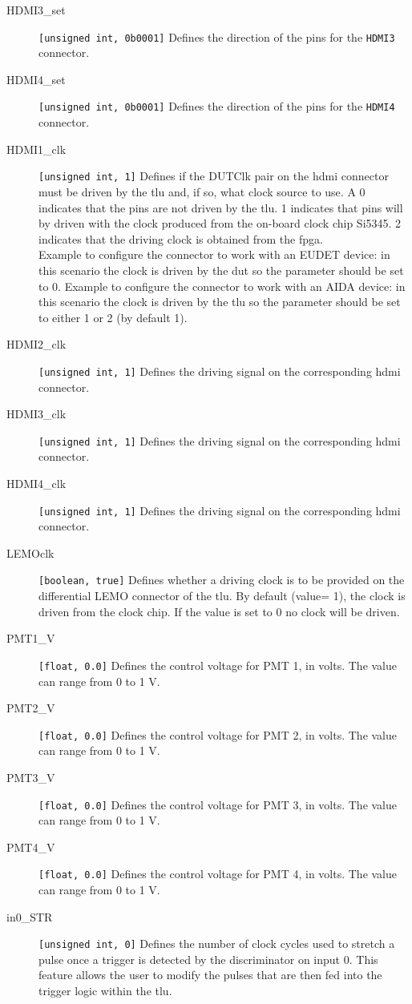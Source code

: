 \begin{description}
  \item[HDMI3\_set] \verb|[unsigned int, 0b0001]| Defines the direction of the pins for the \verb|HDMI3| connector.
  \item[HDMI4\_set] \verb|[unsigned int, 0b0001]| Defines the direction of the pins for the \verb|HDMI4| connector.
  \item[HDMI1\_clk] \verb|[unsigned int, 1]| Defines if the DUTClk pair on the \gls{hdmi} connector must be driven by the \gls{tlu} and, if so, what clock source to use. A 0 indicates that the pins are not driven by the \gls{tlu}. 1 indicates that pins will by driven with the clock produced from the on-board clock chip Si5345. 2 indicates that the driving clock is obtained from the \gls{fpga}.\\
      Example to configure the connector to work with an EUDET device: in this scenario the clock is driven by the \gls{dut} so the parameter should be set to 0.
      Example to configure the connector to work with an AIDA device: in this scenario the clock is driven by the \gls{tlu} so the parameter should be set to either 1 or 2 (by default 1).
  \item[HDMI2\_clk] \verb|[unsigned int, 1]| Defines the driving signal on the corresponding \gls{hdmi} connector.
  \item[HDMI3\_clk] \verb|[unsigned int, 1]| Defines the driving signal on the corresponding \gls{hdmi} connector.
  \item[HDMI4\_clk] \verb|[unsigned int, 1]| Defines the driving signal on the corresponding \gls{hdmi} connector.
  \item[LEMOclk] \verb|[boolean, true]| Defines whether a driving clock is to be provided on the differential LEMO connector of the \gls{tlu}. By default (value= 1), the clock is driven from the clock chip. If the value is set to 0 no clock will be driven.
  \item[PMT1\_V] \verb|[float, 0.0]| Defines the control voltage for PMT 1, in volts. The value can range from 0 to 1 V.
  \item[PMT2\_V] \verb|[float, 0.0]| Defines the control voltage for PMT 2, in volts. The value can range from 0 to 1 V.
  \item[PMT3\_V] \verb|[float, 0.0]| Defines the control voltage for PMT 3, in volts. The value can range from 0 to 1 V.
  \item[PMT4\_V] \verb|[float, 0.0]| Defines the control voltage for PMT 4, in volts. The value can range from 0 to 1 V.
  \item[in0\_STR] \verb|[unsigned int, 0]| Defines the number of clock cycles used to stretch a pulse once a trigger is detected by the discriminator on input 0. This feature allows the user to modify the pulses that are then fed into the trigger logic within the \gls{tlu}.

\end{description}
